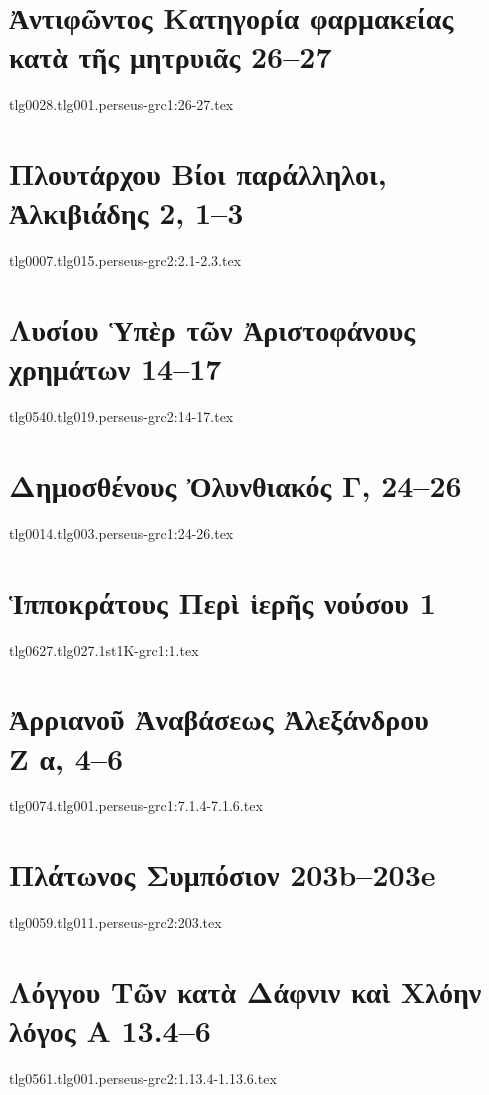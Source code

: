 \documentclass[a4paper,12pt,twoside]{report}
\begin{document}
\chapter[Ἀντιφῶντος Κατηγορία φαρμακείας\dots]{\textgreek[variant=ancient]{Ἀντιφῶντος Κατηγορία φαρμακείας κατὰ τῆς μητρυιᾶς} 26–27}
{tlg0028.tlg001.perseus-grc1:26-27.tex}
\chapter[Πλουτάρχου Ἀλκιβιάδης]{\textgreek[variant=ancient]{Πλουτάρχου Βίοι παράλληλοι, \\Ἀλκιβιάδης} 2, 1–3}
{tlg0007.tlg015.perseus-grc2:2.1-2.3.tex}
\chapter[Λυσίου Ὑπὲρ τῶν Ἀριστοφάνους χρημάτων]{\textgreek[variant=ancient]{Λυσίου Ὑπὲρ τῶν Ἀριστοφάνους χρημάτων} 14–17}
{tlg0540.tlg019.perseus-grc2:14-17.tex}

\chapter[Δημοσθένους Ὀλυνθιακός Γ]{\textgreek[variant=ancient]{Δημοσθένους Ὀλυνθιακός Γ,} 24–26}
{tlg0014.tlg003.perseus-grc1:24-26.tex}

\chapter[Ἱπποκράτους Περὶ ἱερῆς νούσου]{\textgreek[variant=ancient]{Ἱπποκράτους Περὶ ἱερῆς νούσου} 1}
{tlg0627.tlg027.1st1K-grc1:1.tex}
\chapter[Ἀρριανοῦ Ἀναβάσεως Ἀλεξάνδρου Ζ]{\textgreek[variant=ancient]{Ἀρριανοῦ Ἀναβάσεως Ἀλεξάνδρου \\Ζ α,} 4–6}
{tlg0074.tlg001.perseus-grc1:7.1.4-7.1.6.tex}
\chapter[Πλάτωνος Συμπόσιον]{\textgreek[variant=ancient]{Πλάτωνος Συμπόσιον} 203b–203e}
{tlg0059.tlg011.perseus-grc2:203.tex}
\chapter[Λόγγου Τῶν κατὰ Δάφνιν καὶ Χλόην]{\textgreek[variant=ancient]{Λόγγου Τῶν κατὰ Δάφνιν καὶ Χλόην λόγος Α} 13.4–6}
{tlg0561.tlg001.perseus-grc2:1.13.4-1.13.6.tex}
\end{document}
